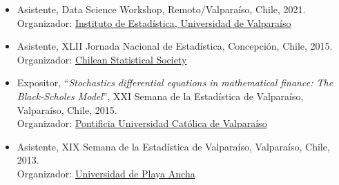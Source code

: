 \documentclass[10pt,a4paper]{article}
\begin{document}
\begin{itemize}
\item Asistente, Data Science Workshop, Remoto/Valparaíso, Chile, 2021.\\
Organizador: \href{https://ideuv.uv.cl/}{Instituto de Estadística, Universidad de Valparaíso}

\item Asistente, XLII Jornada Nacional de Estadística, Concepción, Chile, 2015. \\
Organizador:  \href{http://www.soche.cl}{ Chilean Statistical
Society}
\item Expositor, ``\textit{Stochastics differential equations in mathematical finance: The Black-Scholes Model}'', XXI Semana de la Estadística de Valparaíso, Valparaíso, Chile, 2015. \\ Organizador: \href{http://www.pucv.cl}{Pontificia Universidad Católica de Valparaíso}

\item Asistente, XIX Semana de la Estadística de Valparaíso, Valparaíso, Chile, 2013. \\ Organizador:  \href{http://www.upla.cl}{Universidad de Playa Ancha}


\end{itemize}
\end{document}

